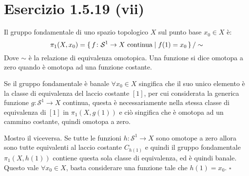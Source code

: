 \documentclass[10pt]{scrartcl}
\newcommand{\Sph}[1][]{\mathcal{S}^#1}
\begin{document}
\section{Esercizio 1.5.19 (vii)}
Il gruppo fondamentale di uno spazio topologico $ X $ sul punto base $ x_0 \in X $
è:
\[
  \pi_1(X,x_0) = \set{ f \colon \Sph{1} \to X \text{ continua} | f(1) = x_0 } \slash \sim
\]
Dove $ \sim $ è la relazione di equivalenza omotopica. Una funzione si dice
omotopa a zero quando è omotopa ad una funzione costante.

Se il gruppo fondamentale è banale $ \forall x_0 \in X $ singifica che il suo unico elemento
è la classe di equivalenza del laccio costante $ [1] $, per cui considerata
la generica funzione $ g \colon \Sph{1} \to X $ continua, questa è necessariamente
nella stessa classe di equivalenza di $ [1] $ in $ \pi_1(X, g(1)) $ e ciò singifica
che è omotopa ad un cammino costante, quindi omotopa a zero.

Mostro il viceversa. Se tutte le funzioni $ h \colon \Sph{1} \to X $ sono omotope a zero
allora sono tutte equivalenti al laccio costante $ C_{h(1)} $ e quindi il gruppo
fondamentale $ \pi_1(X, h(1)) $ contiene questa sola classe di equivalenza, ed è
quindi banale. Questo vale $ \forall x_0 \in X $, basta considerare una funzione tale
che $ h(1) = x_0 $.
\hfill $ \square $
\end{document}

